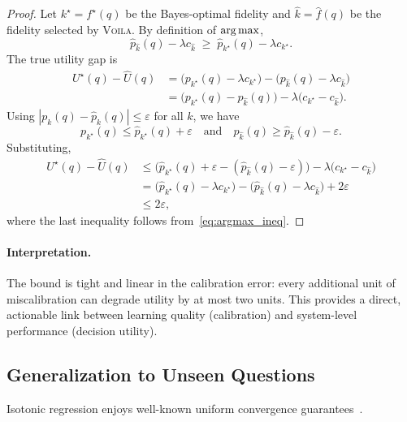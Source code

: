 \begin{proof}
Let $k^\star=f^\star(q)$ be the Bayes-optimal fidelity and $\hat k = \hat f(q)$ be the fidelity
selected by \textsc{Voila}.
By definition of $\operatorname*{arg\,max}$,
\begin{equation}
\hat p_{\hat k}(q) - \lambda c_{\hat k}
\;\ge\;
\hat p_{k^\star}(q) - \lambda c_{k^\star}.
\label{eq:argmax_ineq}
\end{equation}
The true utility gap is
\begin{align*}
U^\star(q) - \hat U(q)
&= \bigl(p_{k^\star}(q) - \lambda c_{k^\star}\bigr)
- \bigl(p_{\hat k}(q) - \lambda c_{\hat k}\bigr) \\
&= \bigl(p_{k^\star}(q) - p_{\hat k}(q)\bigr)
- \lambda\bigl(c_{k^\star} - c_{\hat k}\bigr).
\end{align*}
Using $|p_k(q) - \hat p_k(q)| \le \varepsilon$ for all $k$, we have
\[
p_{k^\star}(q) \le \hat p_{k^\star}(q) + \varepsilon
\quad\text{and}\quad
p_{\hat k}(q) \ge \hat p_{\hat k}(q) - \varepsilon.
\]
Substituting,
\begin{align*}
U^\star(q) - \hat U(q)
&\le \bigl(\hat p_{k^\star}(q) + \varepsilon - (\hat p_{\hat k}(q) - \varepsilon)\bigr)
- \lambda\bigl(c_{k^\star} - c_{\hat k}\bigr) \\
&= \bigl(\hat p_{k^\star}(q) - \lambda c_{k^\star}\bigr)
- \bigl(\hat p_{\hat k}(q) - \lambda c_{\hat k}\bigr) + 2\varepsilon \\
&\le 2\varepsilon,
\end{align*}
where the last inequality follows from~\eqref{eq:argmax_ineq}.
\end{proof}

\paragraph{Interpretation.}
The bound is tight and linear in the calibration error: every additional unit of miscalibration
can degrade utility by at most two units. This provides a direct, actionable link between
learning quality (calibration) and system-level performance (decision utility).

\vspace{-0.4em}
\subsection{Generalization to Unseen Questions}
\label{sec:generalization}

Isotonic regression enjoys well-known uniform convergence guarantees~\cite{yang2018contractionuniformconvergenceisotonic, lim2025review}.

